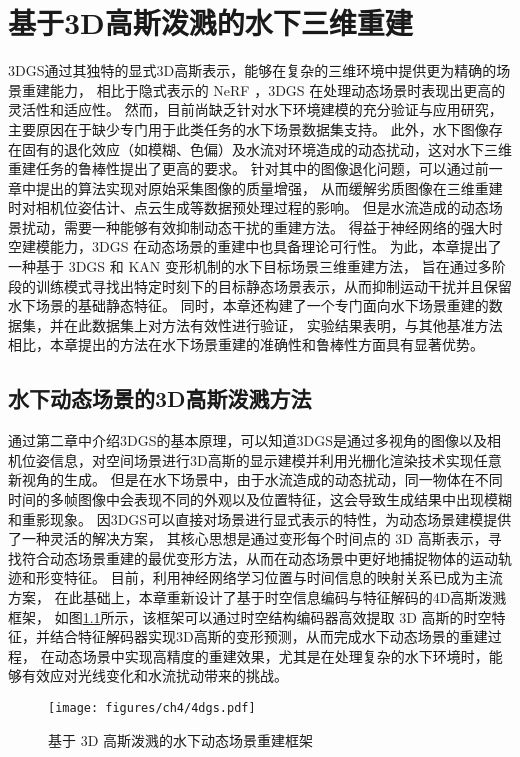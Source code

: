 
\chapter{基于3D高斯泼溅的水下三维重建}
3DGS\cite{3DGS}通过其独特的显式3D高斯表示，能够在复杂的三维环境中提供更为精确的场景重建能力，
相比于隐式表示的 NeRF \cite{nerf}，3DGS 在处理动态场景时表现出更高的灵活性和适应性。
然而，目前尚缺乏针对水下环境建模的充分验证与应用研究，主要原因在于缺少专门用于此类任务的水下场景数据集支持。
此外，水下图像存在固有的退化效应（如模糊、色偏）及水流对环境造成的动态扰动，这对水下三维重建任务的鲁棒性提出了更高的要求。
针对其中的图像退化问题，可以通过前一章中提出的算法实现对原始采集图像的质量增强，
从而缓解劣质图像在三维重建时对相机位姿估计、点云生成等数据预处理过程的影响。
但是水流造成的动态场景扰动，需要一种能够有效抑制动态干扰的重建方法。
得益于神经网络的强大时空建模能力，3DGS 在动态场景的重建中也具备理论可行性。
为此，本章提出了一种基于 3DGS 和 KAN \cite{kan}变形机制的水下目标场景三维重建方法，
旨在通过多阶段的训练模式寻找出特定时刻下的目标静态场景表示，从而抑制运动干扰并且保留水下场景的基础静态特征。
同时，本章还构建了一个专门面向水下场景重建的数据集，并在此数据集上对方法有效性进行验证，
实验结果表明，与其他基准方法相比，本章提出的方法在水下场景重建的准确性和鲁棒性方面具有显著优势。

\section{水下动态场景的3D高斯泼溅方法} \label{sec:4dgs}
通过第二章中介绍3DGS的基本原理，可以知道3DGS是通过多视角的图像以及相机位姿信息，对空间场景进行3D高斯的显示建模并利用光栅化渲染技术实现任意新视角的生成。
但是在水下场景中，由于水流造成的动态扰动，同一物体在不同时间的多帧图像中会表现不同的外观以及位置特征，这会导致生成结果中出现模糊和重影现象。
因3DGS可以直接对场景进行显式表示的特性，为动态场景建模提供了一种灵活的解决方案，
其核心思想是通过变形每个时间点的 3D 高斯表示，寻找符合动态场景重建的最优变形方法，从而在动态场景中更好地捕捉物体的运动轨迹和形变特征。
目前，利用神经网络学习位置与时间信息的映射关系已成为主流方案，
在此基础上，本章重新设计了基于时空信息编码与特征解码的4D高斯泼溅\cite{4DGS}框架，
如图\ref{img:4dgs}所示，该框架可以通过时空结构编码器高效提取 3D 高斯的时空特征，并结合特征解码器实现3D高斯的变形预测，从而完成水下动态场景的重建过程，
在动态场景中实现高精度的重建效果，尤其是在处理复杂的水下环境时，能够有效应对光线变化和水流扰动带来的挑战。
\begin{figure}[ht]
    \vspace{4mm}
    \centering
    \texttt{[image: figures/ch4/4dgs.pdf]}
    \vspace{4mm}
    \caption{基于 3D 高斯泼溅的水下动态场景重建框架}
    \label{img:4dgs}
    \vspace{4mm}
\end{figure}

